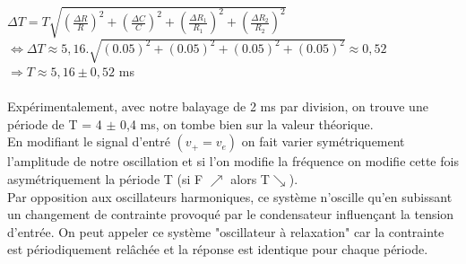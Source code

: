 \documentclass[11pt,a4paper]{article}
\begin{document}
$\Delta T = T\sqrt{\left(\frac{\Delta R}{R}\right)^2 + \left(\frac{\Delta C}{C}\right)^2 + \left(\frac{\Delta R_1}{R_1}\right)^2 + \left(\frac{\Delta R_2}{R_2}\right)^2 }$\\
$\Leftrightarrow \Delta T \approx 5,16.\sqrt{\left(0.05\right)^2 + \left(0.05\right)^2 + \left(0.05\right)^2 + \left(0.05\right)^2 } \approx 0,52 $\\
$\Rightarrow T \approx 5,16 \pm 0,52$ ms\\
\\
Expérimentalement, avec notre balayage de 2 ms par division, on trouve une période de T = 4 $\pm$ 0,4 ms, on tombe bien sur la valeur théorique.\\
En modifiant le signal d'entré $(v_+ = v_e)$ on fait varier symétriquement l'amplitude de notre oscillation et si l'on modifie la fréquence on modifie cette fois asymétriquement la période T (si F $\nearrow$ alors T$\searrow$).\\

Par opposition aux oscillateurs harmoniques, ce système n'oscille qu'en subissant un changement de contrainte provoqué par le condensateur influençant la tension d'entrée. On peut appeler ce système "oscillateur à relaxation" car la contrainte est périodiquement relâchée et la réponse est identique pour chaque période.
\end{document}
